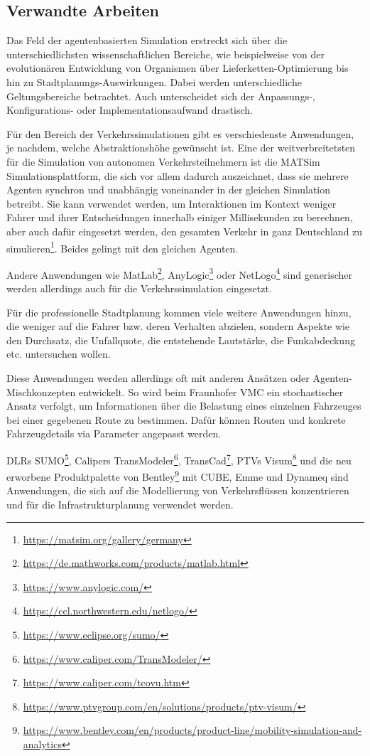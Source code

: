 \subsection{Verwandte Arbeiten}

Das Feld der agentenbasierten Simulation erstreckt sich über die unterschiedlichsten wissenschaftlichen Bereiche, wie beispielweise von der evolutionären Entwicklung von Organismen über Lieferketten-Optimierung bis hin zu Stadtplanungs-Auswirkungen.
Dabei werden unterschiedliche Geltungsbereiche betrachtet.
Auch unterscheidet sich der Anpassungs-, Konfi\-gurations- oder Implementationsaufwand drastisch\autocite{abar2017}.

Für den Bereich der Verkehrssimulationen gibt es verschiedenste Anwendungen, je nachdem, welche Abstraktionshöhe gewünscht ist.
Eine der weitverbreitetsten für die Simulation von autonomen Verkehrsteilnehmern\autocite{jing2020} ist die MATSim Simulationsplattform, die sich vor allem dadurch auszeichnet, dass sie mehrere Agenten synchron und unabhängig voneinander in der gleichen Simulation betreibt.\autocite{axhausen2016}
Sie kann verwendet werden, um Interaktionen im Kontext weniger Fahrer und ihrer Entscheidungen innerhalb einiger Millisekunden zu berechnen, aber auch dafür eingesetzt werden, den gesamten Verkehr in ganz Deutschland zu simulieren\footnote{\url{https://matsim.org/gallery/germany}}.
Beides gelingt mit den gleichen Agenten.

Andere Anwendungen wie MatLab\footnote{\url{https://de.mathworks.com/products/matlab.html}}, AnyLogic\footnote{\url{https://www.anylogic.com/}} oder NetLogo\footnote{\url{https://ccl.northwestern.edu/netlogo/}} sind generischer werden allerdings auch für die Verkehrssimulation eingesetzt\autocite{jing2020}.

Für die professionelle Stadtplanung kommen viele weitere Anwendungen hinzu, die weniger auf die Fahrer bzw. deren Verhalten abzielen, sondern Aspekte wie den Durchsatz, die Unfallquote, die entstehende Lautstärke, die Funkabdeckung etc. untersuchen wollen.

Diese Anwendungen werden allerdings oft mit anderen Ansätzen oder Agen\-ten-Mischkonzepten entwickelt.
So wird beim Fraunhofer VMC ein stochastischer Ansatz verfolgt, um Informationen über die Belastung eines einzelnen Fahrzeuges bei einer gegebenen Route zu bestimmen\autocite{burger2021}.
Dafür können Routen und konkrete Fahrzeugdetails via Parameter angepasst werden.

DLRs SUMO\footnote{\url{https://www.eclipse.org/sumo/}}, Calipers TransModeler\footnote{\url{https://www.caliper.com/TransModeler/}}, TransCad\footnote{\url{https://www.caliper.com/tcovu.htm}}, PTVs Visum\footnote{\url{https://www.ptvgroup.com/en/solutions/products/ptv-visum/}} und die neu erworbene Produktpalette von Bentley\footnote{\url{https://www.bentley.com/en/products/product-line/mobility-simulation-and-analytics}} mit CUBE, Emme und Dynameq sind Anwendungen, die sich auf die Modellierung von Verkehrsflüssen konzentrieren und für die Infrastrukturplanung verwendet werden.

